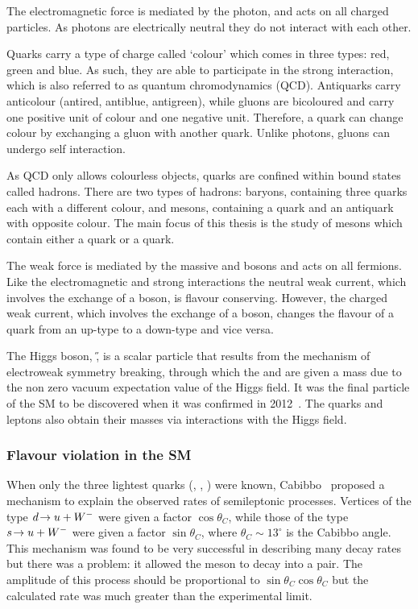 The electromagnetic force is mediated by the photon, and acts on all charged particles. As photons are electrically neutral they do not interact with each other.

Quarks carry a type of charge called `colour' which comes in three types: red, green and blue. As such, they are able to participate in the strong interaction, which is also referred to as quantum chromodynamics (QCD). Antiquarks carry anticolour (antired, antiblue, antigreen), while gluons are bicoloured and carry one positive unit of colour and one negative unit. Therefore, a quark can change colour by exchanging a gluon with another quark. Unlike photons, gluons can undergo self interaction. 

As QCD only allows colourless objects, quarks are confined within bound states called hadrons. There are two types of hadrons: baryons, containing three quarks each with a different colour, and mesons, containing a quark and an antiquark with opposite colour. The main focus of this thesis is the study of \B mesons which contain either a \bquark quark or a \bquarkbar quark.

The weak force is mediated by the massive \Wpm and \Z bosons and acts on all fermions. Like the electromagnetic and strong interactions the neutral weak current, which involves the exchange of a \Z boson, is flavour conserving. However, the charged weak current, which involves the exchange of a \Wpm boson, changes the flavour of a quark from an up-type to a down-type and vice versa.

The Higgs boson, \H, is a scalar particle that results from the mechanism of electroweak symmetry breaking, through which the \Wpm and \Z are given a mass due to the non zero vacuum expectation value of the Higgs field. It was the final particle of the SM to be discovered when it was confirmed in 2012~\cite{higgs-atlas,higgs-cms}. The quarks and leptons also obtain their masses via interactions with the Higgs field. 

\subsubsection{Flavour violation in the SM}

When only the three lightest quarks (\uquark, \dquark, \squark) were known, Cabibbo~\cite{cabbibo} proposed a mechanism to explain the observed rates of semileptonic processes. Vertices of the type ${d}\!\rightarrow {\ensuremath{u}}+{W^-}$ were given a factor $\cos\theta_{C}$, while those of the type ${s}\!\rightarrow {\ensuremath{u}}+{W^-}$ were given a factor $\sin\theta_{C}$, where $\theta_{C}\sim13^{\circ}$ is the Cabibbo angle. This mechanism was found to be very successful in describing many decay rates but there was a problem: it allowed the \Kz meson to decay into a \mumu pair. The amplitude of this process should be proportional to $\sin\theta_{C}\cos\theta_{C}$ but the calculated rate was much greater than the experimental limit. 


